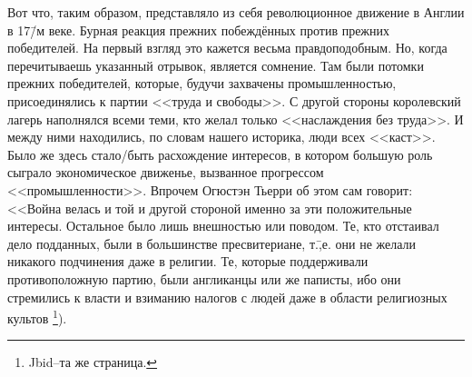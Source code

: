 Вот что, таким образом, представляло из себя революционное движение в Англии в 17\=/м веке. Бурная реакция прежних побеждённых против прежних победителей. На первый взгляд это кажется весьма правдоподобным. Но, когда перечитываешь указанный отрывок, является сомнение. Там были потомки прежних победителей, которые, будучи захвачены промышленностью, присоединялись к партии <<труда и свободы>>. С другой стороны королевский лагерь наполнялся всеми теми, кто желал только <<наслаждения без труда>>. И между ними находились, по словам нашего историка, люди всех <<каст>>. Было же здесь стало\-/быть расхождение интересов, в котором большую роль сыграло экономическое движенье, вызванное прогрессом <<промышленности>>. Впрочем Огюстэн Тьерри об этом сам говорит: <<Война велась и той и другой стороной именно за эти положительные интересы. Остальное было лишь внешностью или поводом. Те, кто отстаивал дело подданных, были в большинстве пресвитериане, т.\=,е. они не желали никакого подчинения даже в религии. Те, которые поддерживали противоположную партию, были англиканцы или же паписты, ибо они стремились к власти и взиманию налогов с людей даже в области религиозных культов \footnote{Jbid\---та же страница.}).

